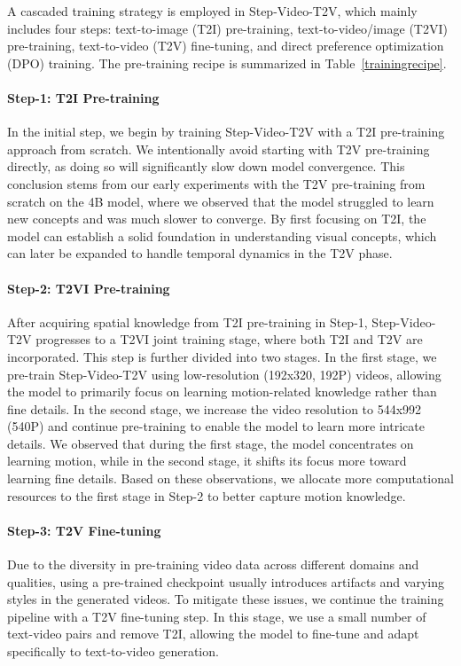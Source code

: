 A cascaded training strategy is employed in Step-Video-T2V, which mainly includes four steps: text-to-image (T2I) pre-training, text-to-video/image (T2VI) pre-training, text-to-video (T2V) fine-tuning, and direct preference optimization (DPO) training. The pre-training recipe is summarized in Table~\ref{trainingrecipe}.

\paragraph{Step-1: T2I Pre-training} In the initial step, we begin by training Step-Video-T2V with a T2I pre-training approach from scratch. We intentionally avoid starting with T2V pre-training directly, as doing so will significantly slow down model convergence. This conclusion stems from our early experiments with the T2V pre-training from scratch on the 4B model, where we observed that the model struggled to learn new concepts and was much slower to converge. By first focusing on T2I, the model can establish a solid foundation in understanding visual concepts, which can later be expanded to handle temporal dynamics in the T2V phase.

\paragraph{Step-2: T2VI Pre-training} After acquiring spatial knowledge from T2I pre-training in Step-1, Step-Video-T2V progresses to a T2VI joint training stage, where both T2I and T2V are incorporated. This step is further divided into two stages. In the first stage, we pre-train Step-Video-T2V using low-resolution (192x320, 192P) videos, allowing the model to primarily focus on learning motion-related knowledge rather than fine details. In the second stage, we increase the video resolution to 544x992 (540P) and continue pre-training to enable the model to learn more intricate details. We observed that during the first stage, the model concentrates on learning motion, while in the second stage, it shifts its focus more toward learning fine details. Based on these observations, we allocate more computational resources to the first stage in Step-2 to better capture motion knowledge.

\paragraph{Step-3: T2V Fine-tuning} Due to the diversity in pre-training video data across different domains and qualities, using a pre-trained checkpoint usually introduces artifacts and varying styles in the generated videos. To mitigate these issues, we continue the training pipeline with a T2V fine-tuning step. In this stage, we use a small number of text-video pairs and remove T2I, allowing the model to fine-tune and adapt specifically to text-to-video generation.


